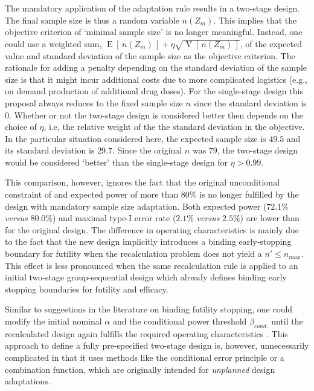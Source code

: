 \documentclass[12pt]{article}
\newcommand{\E}{\ensuremath{\operatorname{E}}}
\newcommand{\V}{\operatorname{V}}
\begin{document}
The mandatory application of the adaptation rule
results in a two-stage design.
The final sample size is thus a random variable $n(Z_m)$.
This implies that the objective criterion of `minimal sample size' is no longer meaningful.
Instead, one could use a weighted sum, $\E[\,n(Z_m)\,] + \eta \sqrt{\V[\,n(Z_m)\,]}$, of the expected value and standard deviation of the sample size as the objective criterion.
The rationale for adding a penalty depending on the standard deviation of the sample size is that it might incur additional costs due to more
complicated logistics (e.g., on demand production of additional drug doses).
For the single-stage design this proposal always reduces to the fixed sample size $n$ since the standard deviation is 0.
Whether or not the two-stage design is considered better then depends on the choice of $\eta$,
i.e, the relative weight of the the standard deviation in the objective.
In the particular situation considered here, the expected sample size is $49.5$ and its standard deviation is $29.7$.
Since the original $n$ was $79$, the two-stage
design would be considered `better'
than the single-stage design for $\eta>0.99$.

This comparison, however, ignores the fact that
the original unconditional constraint of and expected power of more than $80\%$
is no longer fulfilled by the design with mandatory
sample size adaptation.
Both expected power ($72.1\%$ \emph{versus} $80.0\%$) and maximal type-I error rate ($2.1\%$ \emph{versus} $2.5\%$) are lower than for the original design.
The difference in operating characteristics is mainly due to the fact
that the new design implicitly introduces a binding early-stopping boundary for futility
when the recalculation problem does not yield a $n'\leq n_{max}$.
This effect is less pronounced when the same recalculation rule is applied
to an initial two-stage group-sequential design
which already defines binding early stopping boundaries
for futility and efficacy.

Similar to suggestions in the literature on binding futility stopping,
one could modify the initial nominal $\alpha$ and the conditional power threshold $\beta_{cond.}$ until the recalculated design again fulfills the required
operating characteristics \cite{brannath2004}.
This approach to define a fully pre-specified two-stage design is, however, unnecessarily complicated in that it
uses methods like the conditional error principle or a combination function, which are originally intended for \emph{unplanned}
design adaptations.
\end{document}
